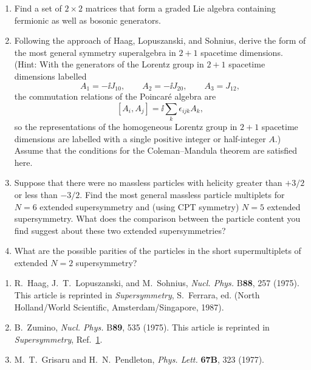 

\begin{enumerate}
  \item Find a set of $2\times 2$ matrices that form a graded Lie algebra
  containing fermionic as well as bosonic generators.

  \item Following the approach of Haag, Lopuszanski, and Sohnius, derive
  the form of the most general symmetry superalgebra in $2+1$ spacetime
  dimensions. (Hint: With the generators of the Lorentz group in $2+1$
  spacetime dimensions labelled
  \[
    A_1=-\ii J_{10},\qquad A_2=-\ii J_{20},\qquad A_3=J_{12},
  \]
  the commutation relations of the Poincar\'e algebra are
  \[
    [A_i,A_j]=\ii\sum_k\epsilon_{ijk}A_k,
  \]
  so the representations of the homogeneous Lorentz group in $2+1$
  spacetime dimensions are labelled with a single positive integer or
  half-integer $A$.) Assume that the conditions for the Coleman--Mandula
  theorem are satisfied here.

  \item Suppose that there were no massless particles with helicity greater
  than $+3/2$ or less than $-3/2$. Find the most general massless particle
  multiplets for $N=6$ extended supersymmetry and (using CPT symmetry)
  $N=5$ extended supersymmetry. What does the comparison between the
  particle content you find suggest about these two extended
  supersymmetries?

  \item What are the possible parities of the particles in the short
  supermultiplets of extended $N=2$ supersymmetry?
\end{enumerate}


\begin{enumerate}
  \item {}\label{ch25-ref-1}
  R.~Haag, J.~T.~Lopuszanski, and M.~Sohnius, \textit{Nucl. Phys.}
  B\textbf{88}, 257 (1975). This article is reprinted in
  \textit{Supersymmetry}, S.~Ferrara, ed. (North Holland/World
  Scientific, Amsterdam/Singapore, 1987).

  \item {}\label{ch25-ref-2}
  B.~Zumino, \textit{Nucl. Phys.} B\textbf{89}, 535 (1975). This article
  is reprinted in \textit{Supersymmetry},
  Ref.~\hyperref[ch25-ref-1]{1}.

  \item {}\label{ch25-ref-3}
  M.~T.~Grisaru and H.~N.~Pendleton, \textit{Phys. Lett.}
  \textbf{67B}, 323 (1977).
\end{enumerate}
